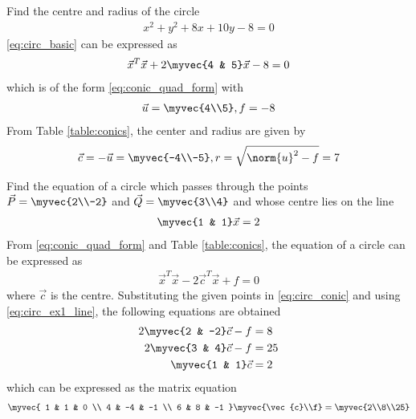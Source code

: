 \item  Find the centre and radius of the circle 
\begin{align}
x^2+y^2+8x+10y-8 = 0
\label{eq:circ_basic}
\end{align}
\solution
\eqref{eq:circ_basic} can be expressed as 
\begin{align}
\vec{x}^T\vec{x}+ 2\myvec{4 & 5}\vec{x} -8 = 0
\end{align}
which is of the form \eqref{eq:conic_quad_form} with
\begin{align}
\label{eq:circ_basic_uf}
\vec{u} = \myvec{4\\5}, f = -8
\end{align}
From  Table \ref{table:conics}, the center and radius are given by 
\begin{align}
\vec{c} = -\vec{u} = \myvec{-4\\-5},
r = \sqrt{\norm{u}^2-f} = 7
\end{align}
\item Find the equation of a circle which passes through the points $\vec{P} = \myvec{2\\-2}$ and $\vec{Q} = \myvec{3\\4}$ and whose centre lies on the line  
\begin{align}
\label{eq:circ_ex1_line}
\myvec{1 & 1} \vec{x} = 2
\end{align}
\solution From \eqref{eq:conic_quad_form} and Table \ref{table:conics}, the equation of a circle can be expressed as
\begin{align}
\label{eq:circ_conic}
\vec{x}^T\vec{x}-2\vec{c}^T\vec{x}+f = 0
\end{align}
where $\vec{c}$ is the centre.
Substituting the given points in 
\eqref{eq:circ_conic} and using 
\eqref{eq:circ_ex1_line}, the following equations are obtained
\begin{align}
2\myvec{2 & -2}\vec{c} -  f &= 8
\\
2\myvec{3 & 4}\vec{c} -  f &= 25
\\
\myvec{1 & 1}\vec{c}  &= 2
\end{align}
which can be expressed as the matrix equation
\begin{align}
\myvec{
1 & 1 & 0
\\
4 & -4 & -1 
\\ 
6 & 8 & -1  
}
\myvec{\vec{c}\\f} = \myvec{2\\8\\25}
\end{align}
